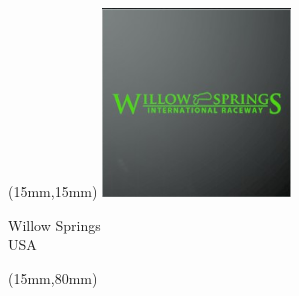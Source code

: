 \begin{textblock*}{50mm}(15mm,15mm)%
\includegraphics[width=50mm]{LG/2015-05-20_00098.png}
\par Willow Springs\\ USA
\end{textblock*}
\begin{textblock*}{185mm}(15mm,80mm)%
\end{textblock*}
